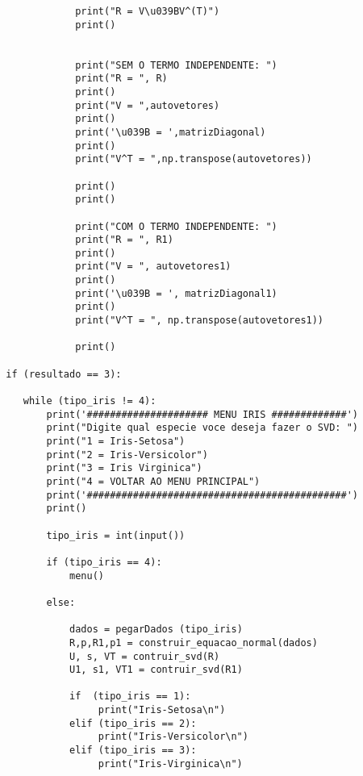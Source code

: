 \documentclass[a4paper,12pt,twoside]{article}
\begin{document}
\begin{lstlisting}
                    print("R = V\u039BV^(T)")
                    print()
                    
                    
                    print("SEM O TERMO INDEPENDENTE: ")
                    print("R = ", R)
                    print()
                    print("V = ",autovetores)
                    print()
                    print('\u039B = ',matrizDiagonal)
                    print()
                    print("V^T = ",np.transpose(autovetores))
                    
                    print()
                    print()
                    
                    print("COM O TERMO INDEPENDENTE: ")
                    print("R = ", R1)
                    print()
                    print("V = ", autovetores1)
                    print()
                    print('\u039B = ', matrizDiagonal1)
                    print()
                    print("V^T = ", np.transpose(autovetores1))
                    
                    print()
        
        if (resultado == 3):
             
           while (tipo_iris != 4):
               print('##################### MENU IRIS #############')
               print("Digite qual especie voce deseja fazer o SVD: ")
               print("1 = Iris-Setosa")
               print("2 = Iris-Versicolor")
               print("3 = Iris Virginica")
               print("4 = VOLTAR AO MENU PRINCIPAL")
               print('#############################################')
               print()
             
               tipo_iris = int(input())
              
               if (tipo_iris == 4):
                   menu()
               
               else:
                
                   dados = pegarDados (tipo_iris)
                   R,p,R1,p1 = construir_equacao_normal(dados)
                   U, s, VT = contruir_svd(R)
                   U1, s1, VT1 = contruir_svd(R1)
                   
                   if  (tipo_iris == 1):
                        print("Iris-Setosa\n")
                   elif (tipo_iris == 2):
                        print("Iris-Versicolor\n")
                   elif (tipo_iris == 3):
                        print("Iris-Virginica\n")
                        

\end{lstlisting}
\end{document}
